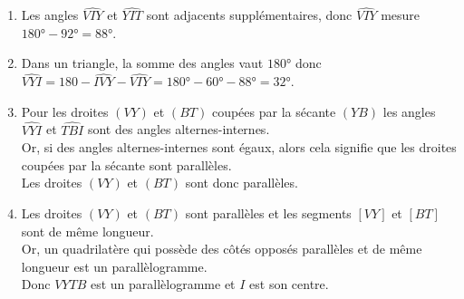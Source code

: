 \begin{corrige}
   \begin{enumerate}
   \item Les angles $\widehat{VIY}$ et $\widehat{YIT}$ sont adjacents supplémentaires, donc $\widehat{VIY}$ mesure $\ang{180}-\ang{92}=\ang{88}$.\\
   \item Dans un triangle, la somme des angles vaut $\ang{180}$ donc $\widehat{VYI}=180-\widehat{IVY}-\widehat{VIY}=\ang{180}-\ang{60}-\ang{88}=\ang{32}$.\\
   \item Pour les droites $(VY)$ et $(BT)$ coupées par la sécante $(YB)$ les angles $\widehat{VYI}$ et $\widehat{TBI}$ sont des angles alternes-internes.\\
   Or, si des angles alternes-internes sont égaux, alors cela signifie que les droites coupées par la sécante sont parallèles.\\
   Les droites $(VY)$ et $(BT)$ sont donc parallèles.\\
   \item Les droites $(VY)$ et $(BT)$ sont parallèles et les segments $[VY]$ et $[BT]$ sont de même longueur.\\
   Or, un quadrilatère qui possède des côtés opposés parallèles et de même longueur est un parallèlogramme.\\
   Donc $VYTB$ est un parallèlogramme et $I$ est son centre.
   \end{enumerate}
\end{corrige}